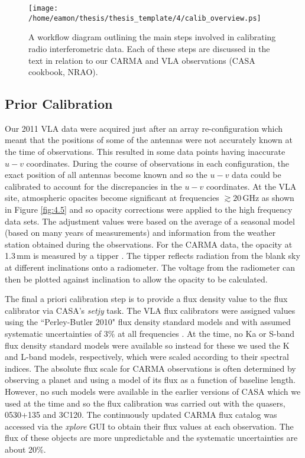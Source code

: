 \begin{figure}[hbt!]
\centering 
\texttt{[image: /home/eamon/thesis/thesis\_template/4/calib\_overview.ps]}  
\caption[Calibration workflow diagram.]{A workflow diagram outlining the main steps involved in calibrating radio interferometric data. Each of these steps are discussed in the text in relation to our CARMA and VLA observations (CASA cookbook, NRAO).}
\label{fig:4.4}
\end{figure}

\subsection{Prior Calibration}
Our 2011 VLA data were acquired just after an array re-configuration which meant that the positions of some of the antennas were not accurately known at the time of observations. This resulted in some data points having inaccurate $u-v$ coordinates. During the course of observations in each configuration, the exact position of all antennas become known and so the $u-v$ data could be calibrated to account for the discrepancies in the $u-v$ coordinates.  At the VLA site, atmospheric opacites become significant at frequencies $\gtrsim 20$\,GHz as shown in Figure \ref{fig:4.5} and so opacity corrections were applied to the high frequency data sets. The adjustment values were based on the average of a seasonal model (based on many years of measurements) and information from the weather station obtained during the observations. For the CARMA data, the opacity at 1.3\,mm is measured by a tipper \citep{white_2009}. The tipper reflects radiation from the blank sky at different inclinations onto a radiometer. The voltage from the radiometer can then be plotted against inclination to allow the opacity to be calculated. 

The final a priori calibration step is to provide a flux density value to the flux calibrator via CASA's \textit{setjy} task. The VLA flux calibrators were assigned values using the ``Perley-Butler 2010" flux density standard models  and with assumed systematic uncertainties of 3\% at all frequencies \citep{perley_2013}. At the time, no Ka or S-band flux density standard models were available so instead for these we used the K and L-band models, respectively, which were scaled according to their spectral indices. The absolute flux scale for CARMA observations is often determined by observing a planet and using a model of its flux as a function of baseline length. However, no such models were available in the earlier versions of CASA which we used at the time and so the flux calibration was carried out with the quasers, 0530+135 and 3C120. The continuously updated CARMA flux catalog was accessed via the \textit{xplore} GUI to obtain their flux values at each observation. The flux of these objects are more unpredictable and the systematic uncertainties are about 20\%.

